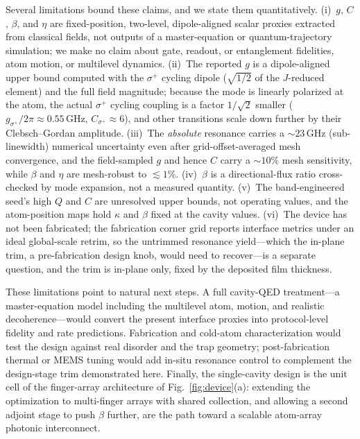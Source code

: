 \documentclass[%
 reprint,
 amsmath,amssymb,
 aps,prx,
 superscriptaddress,
]{revtex4-2}
\newcommand{\unit}[1]{\,\mathrm{#1}}
\begin{document}
Several limitations bound these claims, and we state them quantitatively.
(i)~$g$, $C$, $\beta$, and $\eta$ are fixed-position, two-level, dipole-aligned
scalar proxies extracted from classical fields, not outputs of a master-equation
or quantum-trajectory simulation; we make no claim about gate, readout, or
entanglement fidelities, atom motion, or multilevel dynamics. (ii)~The reported
$g$ is a dipole-aligned upper bound computed with the $\sigma^+$ cycling dipole
($\sqrt{1/2}$ of the $J$-reduced element) and the full field magnitude; because the
mode is linearly polarized at the atom, the actual $\sigma^+$ cycling coupling is a
factor $1/\sqrt2$ smaller ($g_{\sigma^+}/2\pi\approx0.55\unit{GHz}$,
$C_{\sigma^+}\approx6$), and other transitions scale down further by their
Clebsch--Gordan amplitude. (iii)~The \emph{absolute}
resonance carries a $\sim\!23\unit{GHz}$ (sub-linewidth) numerical uncertainty
even after grid-offset-averaged mesh convergence, and the field-sampled $g$ and
hence $C$ carry a $\sim\!10\%$ mesh sensitivity, while $\beta$ and $\eta$ are
mesh-robust to $\lesssim\!1\%$. (iv)~$\beta$ is a directional-flux ratio
cross-checked by mode expansion, not a measured
quantity. (v)~The band-engineered seed's high $Q$ and $C$ are unresolved upper
bounds, not operating values, and the atom-position maps hold $\kappa$ and $\beta$
fixed at the cavity values. (vi)~The device has not been fabricated; the
fabrication corner grid reports interface metrics under an ideal global-scale
retrim, so the untrimmed resonance yield---which the in-plane trim, a
pre-fabrication design knob, would need to recover---is a separate question, and
the trim is in-plane only, fixed by the deposited film thickness.

These limitations point to natural next steps. A full cavity-QED treatment---a
master-equation model including the multilevel atom, motion, and realistic
decoherence---would convert the present interface proxies into protocol-level
fidelity and rate predictions. Fabrication and cold-atom characterization would
test the design against real disorder and the trap geometry; post-fabrication
thermal or MEMS tuning would add in-situ resonance control to complement the
design-stage trim demonstrated here. Finally, the
single-cavity design is the unit cell of the finger-array architecture of
Fig.~\ref{fig:device}(a): extending the optimization to multi-finger arrays with
shared collection, and allowing a second adjoint stage to push $\beta$ further,
are the path toward a scalable atom-array photonic interconnect.
\end{document}
